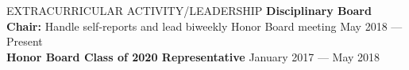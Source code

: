 \documentclass{resume} %
\begin{document}
\begin{rSection}{EXTRACURRICULAR ACTIVITY/LEADERSHIP}
\textbf{Disciplinary Board Chair:} Handle self-reports and lead biweekly Honor Board meeting \hfill {May 2018 ---Present}\\
\textbf{Honor Board Class of 2020 Representative} \hfill {January 2017 --- May 2018}
\end{rSection}

\end{document}
